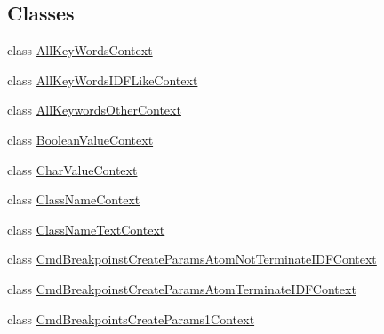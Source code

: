 \subsection*{Classes}
\begin{DoxyCompactItemize}
\item 
class \hyperlink{classgov_1_1nasa_1_1jpf_1_1inspector_1_1server_1_1expression_1_1parser_1_1_expression_grammar_parser_1_1_all_key_words_context}{All\+Key\+Words\+Context}
\item 
class \hyperlink{classgov_1_1nasa_1_1jpf_1_1inspector_1_1server_1_1expression_1_1parser_1_1_expression_grammar_pad664d42a2aee14226e172b869b9ffb3b}{All\+Key\+Words\+I\+D\+F\+Like\+Context}
\item 
class \hyperlink{classgov_1_1nasa_1_1jpf_1_1inspector_1_1server_1_1expression_1_1parser_1_1_expression_grammar_pacb3381aaee949f84c436ba6b73657885}{All\+Keywords\+Other\+Context}
\item 
class \hyperlink{classgov_1_1nasa_1_1jpf_1_1inspector_1_1server_1_1expression_1_1parser_1_1_expression_grammar_parser_1_1_boolean_value_context}{Boolean\+Value\+Context}
\item 
class \hyperlink{classgov_1_1nasa_1_1jpf_1_1inspector_1_1server_1_1expression_1_1parser_1_1_expression_grammar_parser_1_1_char_value_context}{Char\+Value\+Context}
\item 
class \hyperlink{classgov_1_1nasa_1_1jpf_1_1inspector_1_1server_1_1expression_1_1parser_1_1_expression_grammar_parser_1_1_class_name_context}{Class\+Name\+Context}
\item 
class \hyperlink{classgov_1_1nasa_1_1jpf_1_1inspector_1_1server_1_1expression_1_1parser_1_1_expression_grammar_pa73f78f15ab35f00cdc76079d9a864524}{Class\+Name\+Text\+Context}
\item 
class \hyperlink{classgov_1_1nasa_1_1jpf_1_1inspector_1_1server_1_1expression_1_1parser_1_1_expression_grammar_paee196826319d0ea00470866a7ffd8d7b}{Cmd\+Breakpoinst\+Create\+Params\+Atom\+Not\+Terminate\+I\+D\+F\+Context}
\item 
class \hyperlink{classgov_1_1nasa_1_1jpf_1_1inspector_1_1server_1_1expression_1_1parser_1_1_expression_grammar_pa33db42909734e187834b73b54c5beb59}{Cmd\+Breakpoinst\+Create\+Params\+Atom\+Terminate\+I\+D\+F\+Context}
\item 
class \hyperlink{classgov_1_1nasa_1_1jpf_1_1inspector_1_1server_1_1expression_1_1parser_1_1_expression_grammar_pa96543943a9acc7eb3cd37320a4fc3ee4}{Cmd\+Breakpoints\+Create\+Params1\+Context}
\item 

\end{DoxyCompactItemize}
